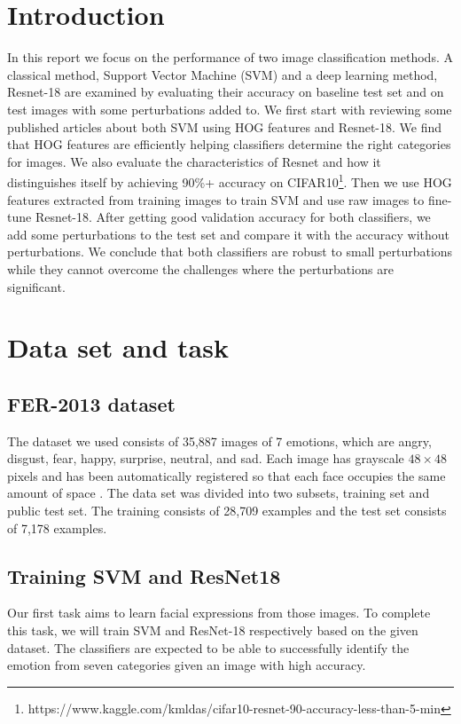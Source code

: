 \documentclass{article}
\begin{document}


\section{Introduction}
\label{sec:intro}
In this report we focus on the performance of two image classification methods. A classical method, Support Vector Machine (SVM) and a deep learning method, Resnet-18 are examined by evaluating their accuracy on baseline test set and on test images with some perturbations added to. We first start with reviewing some published articles about both SVM using HOG features and Resnet-18. We find that HOG features are efficiently helping classifiers determine the right categories for images. We also evaluate the characteristics of Resnet and how it distinguishes itself by achieving 90\%+ accuracy on CIFAR10\footnote{https://www.kaggle.com/kmldas/cifar10-resnet-90-accuracy-less-than-5-min}. 
Then we use HOG features extracted from training images to train SVM and use raw images to fine-tune Resnet-18. After getting good validation accuracy for both classifiers, we add some perturbations to the test set and compare it with the accuracy without perturbations. We conclude that both classifiers are robust to small perturbations while they cannot overcome the challenges where the perturbations are significant.

\section{Data set and task} 
\subsection{FER-2013 dataset}
The dataset we used consists of 35,887 images of 7 emotions, which are angry, disgust, fear, happy, surprise, neutral, and sad. Each image has grayscale $48\times48$ pixels and has been automatically registered so that each face occupies the same amount of space \cite{jumani2019facial}. The data set was divided into two subsets, training set and public test set. The training consists of 28,709 examples and the test set consists of 7,178 examples.

\subsection{Training SVM and ResNet18}
Our first task aims to learn facial expressions from those images. To complete this task, we will train SVM and ResNet-18 respectively based on the given dataset. The classifiers are expected to be able to successfully identify the emotion from seven categories given an image with high accuracy.
\end{document}
